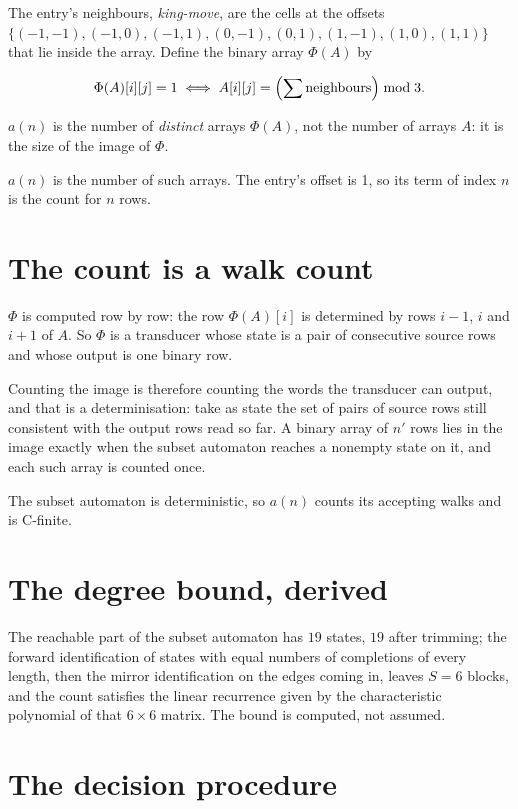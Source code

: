 \documentclass[11pt]{article}
\theoremstyle{definition}
\begin{document}
The entry's neighbours, {\itshape king-move}, are the cells at the offsets $\{(-1,-1), (-1,0), (-1,1), (0,-1), (0,1), (1,-1), (1,0), (1,1)\}$ that lie inside the array. Define the binary array $\Phi(A)$ by

\[\Phi(A)[i][j] = 1 \iff A[i][j] = \Bigl(\sum \text{neighbours}\Bigr) \bmod 3.\]

$a(n)$ is the number of {\itshape distinct} arrays $\Phi(A)$, not the number of arrays $A$: it is the size of the image of $\Phi$.

$a(n)$ is the number of such arrays. The entry's offset is 1, so its term of index $n$ is the count for $n$ rows.

\section{The count is a walk count}

$\Phi$ is computed row by row: the row $\Phi(A)[i]$ is determined by rows $i-1$, $i$ and $i+1$ of $A$. So $\Phi$ is a transducer whose state is a pair of consecutive source rows and whose output is one binary row.

Counting the image is therefore counting the words the transducer can output, and that is a determinisation: take as state the set of pairs of source rows still consistent with the output rows read so far. A binary array of $n'$ rows lies in the image exactly when the subset automaton reaches a nonempty state on it, and each such array is counted once.

The subset automaton is deterministic, so $a(n)$ counts its accepting walks and is C-finite.

\section{The degree bound, derived}

The reachable part of the subset automaton has $19$ states, $19$ after trimming; the forward identification of states with equal numbers of completions of every length, then the mirror identification on the edges coming in, leaves $S = 6$ blocks, and the count satisfies the linear recurrence given by the characteristic polynomial of that $6\times6$ matrix. The bound is computed, not assumed.

\section{The decision procedure}
\end{document}
